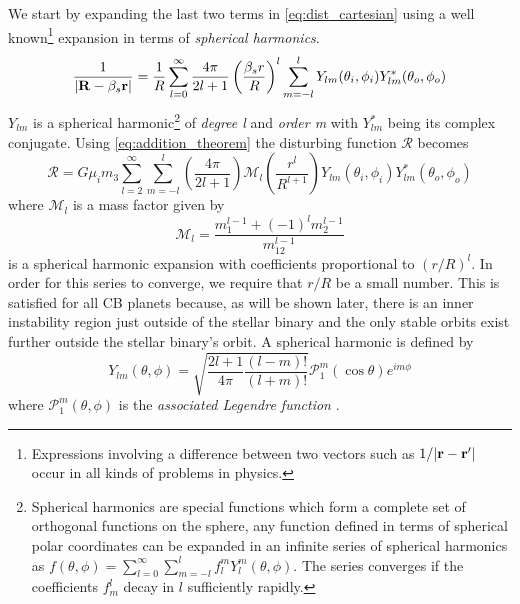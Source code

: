 \documentclass[ twoside,openright,titlepage,numbers=noenddot,headinclude,%
                footinclude=true,cleardoublepage=empty,abstractoff, %
                BCOR=5mm,paper=a4,fontsize=11pt,%
                american,%
                ]{scrreprt}
\begin{document}
We start by expanding the last two terms in \cref{eq:dist_cartesian} using 
a well known\footnote{Expressions involving a difference between two vectors 
such as $1/\lvert \boldsymbol{\mathbf{r}}-\boldsymbol{\mathbf{r}}'\rvert$ occur in all kinds of problems 
in physics.} expansion in terms of \emph{spherical harmonics}. 
\begin{equation}
    \frac{1}{\lvert \boldsymbol{\mathbf{R}} -\beta_s\boldsymbol{\mathbf{r}}\rvert}= \frac{1}{R} \sum^\infty_{l=0}
  \frac{4\pi}{2l+1}   \left( \frac{\beta_s r}{R} \right)^l
    \sum^l_{m=-l} Y_{lm}(\theta_i,\phi_i)
    Y_{lm}^*(\theta_o,\phi_o)
    \label{eq:addition_theorem}
\end{equation}
$Y_{lm}$ is a spherical harmonic\footnote{Spherical harmonics are special
functions which form a complete set of orthogonal functions on the sphere, 
any function defined in terms of spherical polar coordinates can be expanded
in an infinite series of spherical harmonics as $f(\theta,\phi)
=\sum^\infty_{l=0}\sum^l_{m=-l}f^m_lY_l^m(\theta,\phi)$. The series converges 
if the coefficients $f^l_m$ decay in $l$ sufficiently rapidly.} of
\emph{degree l} and \emph{order m} with
$Y_{lm}^*$ being its complex conjugate. Using 
\cref{eq:addition_theorem} the disturbing function $\mathcal{R}$ becomes
\begin{equation}
    \mathcal{R}=G\mu_im_3\sum^\infty_{l=2}\sum^l_{m=-l}\left( \frac{4\pi}{2l+1} 
    \right)\mathcal{M}_l\left( \frac{r^l}{R^{l+1}} \right) Y_{lm}(\theta_i,\phi_i)
    Y_{lm}^*(\theta_o,\phi_o)
\label{eq:dist_harmonics}
\end{equation}
where $\mathcal{M}_l$ is a mass factor given by
\begin{equation}
    \mathcal{M}_l= \frac{m_1^{l-1}+(-1)^lm_2^{l-1}}{m_{12}^{l-1}} 
\end{equation}
 is a spherical harmonic expansion with 
coefficients proportional to $(r/R)^l$. In order for this series
to converge, we require that $r/R$ be a small number. This is satisfied
for all CB planets because, as will be shown later, there is
an inner instability region just outside of the stellar binary and the only
stable orbits exist further outside the stellar binary's orbit. A spherical
harmonic is defined by
\begin{equation}
    Y_{lm}(\theta,\phi)=\sqrt{ \frac{2l+1}{4\pi} \frac{(l-m)!}{(l+m)!} }\mathcal{P}_1^m(
    \cos\theta)e^{im\phi}
    \label{eq:sph_harmonics}
\end{equation}
where $\mathcal{P}_1^m(\theta, \phi)$ is the \emph{associated Legendre function}
\citep{jackson}. 
\end{document}
